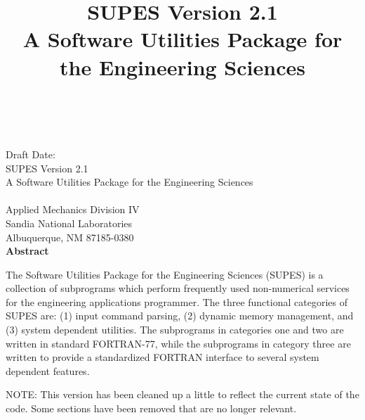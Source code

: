 \newif\ifdraft\drafttrue
\newif\ifsand\sandfalse

\SANDprintDate{\today}
\newcommand{\theTitle}{SUPES Version 2.1\\
A Software Utilities Package for the Engineering Sciences}
\title{\theTitle}
\ifsand
\pdfbookmark[1]{Cover}{cover}
\doCover
\newpage
\else
{}
\setcounter{page}{3}
\fi


\begin{center}
\SANDnumVar\\
\SANDreleaseTypeVar\\
\ifdraft
Draft Date: \SANDprintDateVar\\
\else
Printed \SANDprintDateVar\\
\fi

\vspace{0.75in}
\theTitle\\
\vspace{0.75in}
\SANDauthorVar\\
\vspace*{.25in}
Applied Mechanics Division IV\\
Sandia National Laboratories\\
Albuquerque, NM 87185-0380\\
\vspace*{.5in}
\textbf{Abstract}
\end{center}
\vspace{-.4cm}\par

The Software Utilities Package for the Engineering Sciences (SUPES) is a
collection of subprograms which perform frequently used non-numerical
services for the engineering applications programmer.  The three functional
categories of SUPES are: (1) input command parsing, (2) dynamic memory
management, and (3) system dependent utilities.  The subprograms in categories
one and two are written in standard FORTRAN-77, while the subprograms in
category three are written to provide a standardized FORTRAN interface to
several system dependent features.

NOTE: This version has been cleaned up a little to reflect the current state
of the code.  Some sections have been removed that are no longer relevant.

